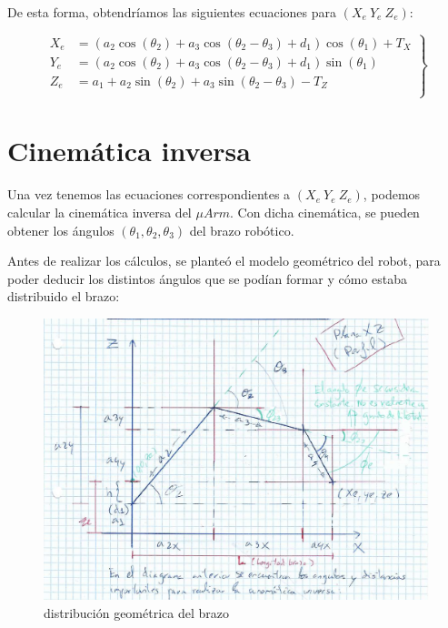 \documentclass[a4paper,12pt]{article}
\begin{document}
De esta forma, obtendríamos las siguientes ecuaciones para $(X_e ~ Y_e ~ Z_e)$:

\begin{equation} \label{eq:XeYeZe}
    \left.\begin{aligned}
        X_e & = \left(a_{2} \cos{\left(\theta_{2} \right)} + a_{3} \cos{\left(\theta_{2} - \theta_{3} \right)} + d_{1}\right) \cos{\left(\theta_{1} \right)} + T_X \\
        Y_e & = \left(a_{2} \cos{\left(\theta_{2} \right)} + a_{3} \cos{\left(\theta_{2} - \theta_{3} \right)} + d_{1}\right) \sin{\left(\theta_{1} \right)}       \\
        Z_e & = a_{1} + a_{2} \sin{\left(\theta_{2} \right)} + a_{3} \sin{\left(\theta_{2} - \theta_{3} \right)} - T_{Z}                                           \\
    \end{aligned}
    \right\}
\end{equation}

\newpage

\section{Cinemática inversa}
\label{sec:ik}

Una vez tenemos las ecuaciones correspondientes a $(X_e ~ Y_e ~ Z_e)$, podemos calcular
la cinemática inversa del $\mu Arm$. Con dicha cinemática, se pueden obtener los ángulos
$(\theta_1, \theta_2, \theta_3)$ del brazo robótico.

Antes de realizar los cálculos, se planteó el modelo geométrico del robot, para poder
deducir los distintos ángulos que se podían formar y cómo estaba distribuido el brazo:

\begin{figure}[H]
    \centering
    \includegraphics[width=.8\linewidth]{images/ik_geometry.png}
    \caption{distribución geométrica del brazo}
    \label{fig:ik_geometry}
\end{figure}
\end{document}
